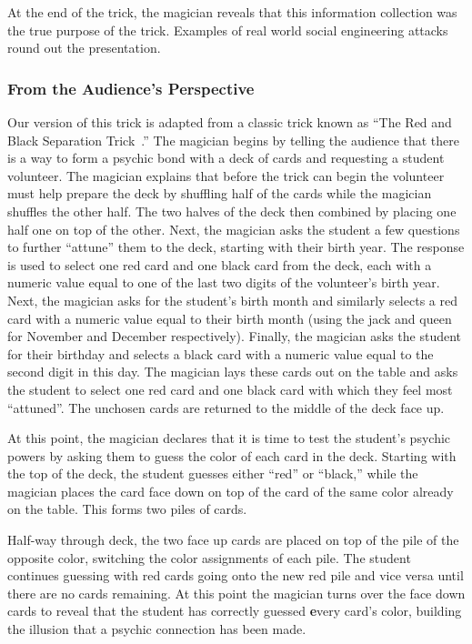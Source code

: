 At the end of the trick, the magician reveals that this information
collection was the true purpose of the trick.
Examples of real world social engineering attacks round out the
presentation.

\subsubsection{From the Audience's Perspective}

Our version of this trick is adapted from a classic trick
known as ``The Red and Black Separation Trick~\cite{redblackseparation}.''
The magician begins by
telling the audience that there
is a way to form a psychic bond with a deck of cards
and requesting a student volunteer.
The magician explains that before the trick can begin the volunteer must
help prepare the deck by shuffling half of the cards while the magician
shuffles the other half.
The two halves of the deck then combined by placing one half
one on top of the other.
Next, the magician asks the student
a few questions to further ``attune'' them to the deck,
starting with their birth year.
The response
is used to select one red card and one black card from the deck,
each with a numeric value equal to one of the last two digits of
the volunteer's birth year.
Next, the magician asks for the student's birth month and similarly selects
a red card with a numeric value equal
to their birth month (using the jack and queen for November and December
respectively).
Finally, the magician asks the student
for their birthday and selects a black card with a numeric value
equal to the second digit in this day.
The magician lays these cards out on the table and asks the student to select
one red card and one black card with which they feel most ``attuned''.
The unchosen cards are returned to the middle
of the deck face up.

At this point, the magician declares
that it is time to test the student's psychic powers by asking them to
guess the color of each card in the deck.  Starting with the top of the deck,
the student guesses either ``red'' or ``black,''  while the magician
places the card face down on top of the card of the same
color already on the table.
This forms two piles of cards.

Half-way through deck,
the two face up cards are placed on top of the
pile of the opposite color, switching the color assignments of
each pile.
The student continues guessing
with red cards going onto the new red pile and vice versa
until
there are no cards remaining.
At this point the magician turns over the face
down cards to reveal that the student has correctly guessed {\textbf every}
card's color, building the illusion that a psychic connection has been made.

